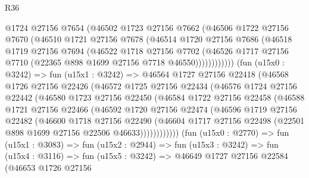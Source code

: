 \begin{lexlean}{R36}
\begin{coremodule}
                @1724
                @27156
                @7654
                (@46502
                  @1723
                  @27156
                  @7662
                  (@46506
                    @1722
                    @27156
                    @7670
                    (@46510
                      @1721
                      @27156
                      @7678
                      (@46514
                        @1720
                        @27156
                        @7686
                        (@46518
                          @1719
                          @27156
                          @7694
                          (@46522
                            @1718
                            @27156
                            @7702
                            (@46526
                              @1717
                              @27156
                              @7710
                              (@22365 @898 @1699 @27156 @7718 @46550))))))))))))
        (fun (u15x0 : @3242) =>
        fun (u15x1 : @3242) =>
        @46564
          @1727
          @27156
          @22418
          (@46568
            @1726
            @27156
            @22426
            (@46572
              @1725
              @27156
              @22434
              (@46576
                @1724
                @27156
                @22442
                (@46580
                  @1723
                  @27156
                  @22450
                  (@46584
                    @1722
                    @27156
                    @22458
                    (@46588
                      @1721
                      @27156
                      @22466
                      (@46592
                        @1720
                        @27156
                        @22474
                        (@46596
                          @1719
                          @27156
                          @22482
                          (@46600
                            @1718
                            @27156
                            @22490
                            (@46604
                              @1717
                              @27156
                              @22498
                              (@22501 @898 @1699 @27156 @22506 @46633))))))))))))
        (fun (u15x0 : @2770) =>
        fun (u15x1 : @3083) =>
        fun (u15x2 : @2944) =>
        fun (u15x3 : @3242) =>
        fun (u15x4 : @3116) =>
        fun (u15x5 : @3242) =>
        @46649
          @1727
          @27156
          @22584
          (@46653
            @1726
            @27156

\end{coremodule}
\end{lexlean}
